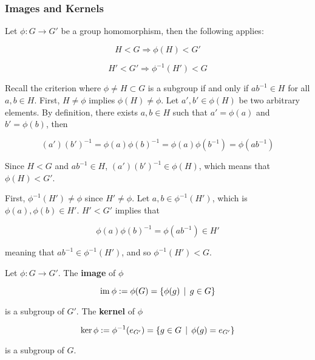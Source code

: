 \documentclass[a4paper,12pt]{article}
\begin{document}
\subsubsection{Images and Kernels}
\begin{pst}
  Let $\phi:G\to G'$ be a group homomorphism, then the following applies:

  \begin{alist}
    \item

    $$H<G\Rightarrow\phi(H)<G'$$

    \item

    $$H'<G'\Rightarrow\phi^{-1}(H')<G$$
  \end{alist}

  \prf {} Recall the criterion where $\phi\neq H\subset G$ is a subgroup if and only if $ab^{-1}\in H$ for all $a,b\in H$. First, $H\neq\phi$ implies $\phi(H)\neq\phi$. Let $a',b'\in\phi(H)$ be two arbitrary elements. By definition, there exists $a,b\in H$ such that $a'=\phi(a)$ and $b'=\phi(b)$, then

  $$(a')(b')^{-1}=\phi(a)\phi(b)^{-1}=\phi(a)\phi(b^{-1})=\phi(ab^{-1})$$\s

  Since $H<G$ and $ab^{-1}\in H$, $(a')(b')^{-1}\in\phi(H)$, which means that $\phi(H)<G'$.\n

   First, $\phi^{-1}(H')\neq\phi$ since $H'\neq\phi$. Let $a,b\in\phi^{-1}(H')$, which is $\phi(a),\phi(b)\in H'$. $H'<G'$ implies that

  $$\phi(a)\phi(b)^{-1}=\phi(ab^{-1})\in H'$$\s

  meaning that $ab^{-1}\in\phi^{-1}(H')$, and so $\phi^{-1}(H')<G$.
\end{pst}\n

\begin{crl}
  Let $\phi:G\to G'$. The \textbf{image} of $\phi$

  $$\mathrm{im}\:\phi:=\phi(G)=\left\{ \phi(g)\,\mid\, g\in G\right\}$$\s

  is a subgroup of $G'$. The \textbf{kernel} of $\phi$

  $$\ker\phi:=\phi^{-1}(e_{G'})=\left\{ g\in G\,\mid\, \phi(g)=e_{G'}\right\}$$\s

  is a subgroup of $G$.
\end{crl}
\end{document}
